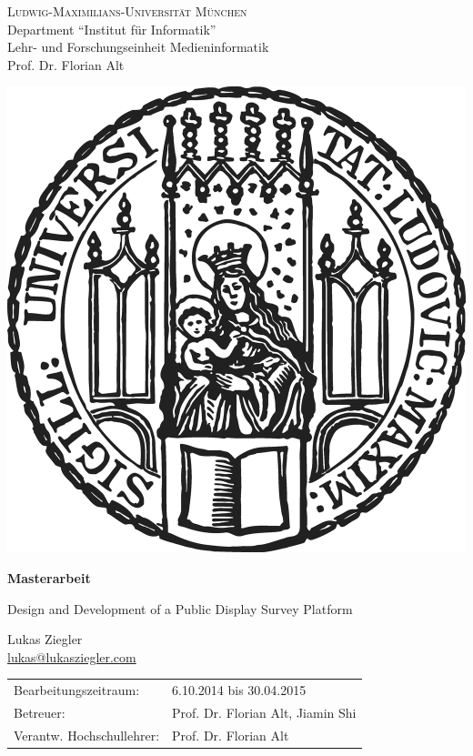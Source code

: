 \documentclass[11pt,a4paper,twoside]{article}
\begin{document}
\pagestyle{empty} %

\begin{center}
\textsc{Ludwig-Maximilians-Universit\"at M\"unchen}\\
Department ``Institut f\"ur Informatik''\\
Lehr- und Forschungseinheit Medieninformatik\\
Prof. Dr. Florian Alt

\vspace{.75cm}
\includegraphics[width=.285\columnwidth]{img/lmu-sigillum.png}
\vspace{.5cm}

{\large\textbf{Masterarbeit}}\vspace{.5cm}

\vspace{2cm}
{\huge Design and Development of a Public Display Survey Platform}
\vspace{2cm}

{\large Lukas Ziegler}\\\href{mailto:lukas@lukasziegler.com}{lukas@lukasziegler.com}

\end{center}
\vfill

\begin{tabular}{ll}
Bearbeitungszeitraum: & 6.10.2014 bis 30.04.2015\\
Betreuer: & Prof. Dr. Florian Alt, Jiamin Shi\\
Verantw. Hochschullehrer: & Prof. Dr. Florian Alt
\end{tabular}

\cleardoublepage

    


\cleardoublepage

    


\cleardoublepage

    

    \vfill %
\end{document}
